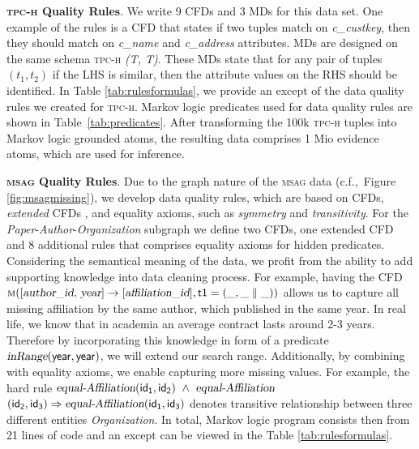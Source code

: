 \textbf{\textsc{tpc-h} Quality Rules}. We write 9 CFDs and 3 MDs for this data set. One example of the rules is a CFD that states if two tuples match on \textsl{c\_custkey}, then they should match on \textsl{c\_name} and \textsl{c\_address} attributes. MDs are designed on the same schema \textsc{tpc-h} \textsl{(T, T)}. These MDs state that for any pair of tuples $(t_1,t_2)$ if the LHS is similar, then the attribute values on the RHS should be identified. In Table \ref{tab:rulesformulas}, we provide an except of the data quality rules we created for \textsc{tpc-h}. Markov logic predicates used for data quality rules are shown in Table~\ref{tab:predicates}. After transforming the 100k \textsc{tpc-h} tuples into Markov logic grounded atoms, the resulting data comprises 1 Mio evidence atoms, which are used for inference. 

\textbf{\textsc{msag} Quality Rules}. Due to the graph nature of the \textsc{msag} data (c.f.,~Figure \ref{fig:msagmissing}), we develop data quality rules, which are based on CFDs, \textit{extended} CFDs \cite{Chen2009extended}, and equality axioms, such as \textit{symmetry} and \textit{transitivity}. For the \textit{Paper}-\textit{Author}-\textit{Organization} subgraph we define two CFDs, one extended CFD and 8 additional rules that comprises equality axioms for hidden predicates. Considering the semantical meaning of the data, we profit from the ability to add supporting knowledge into data cleaning process. For example, having the CFD $\mathsf{\textsc{m}([\textsl{author\_id, year}] \rightarrow [\textsl{affiliation\_id}],t1=(\_,\_ \parallel \_))} $  allows us to capture all missing affiliation by the same author, which published in the same year. In real life, we know that in academia an average contract lasts around 2-3 years. Therefore by incorporating this knowledge in form of a predicate $\mathsf{\textsl{inRange}(year, year)}$, we will extend our search range. Additionally, by combining with equality axioms, we enable capturing more missing values. For example, the hard rule $\mathsf{\textsl{equal-Affiliation}(id_1, id_2) ~\wedge~ \textsl{equal-Affiliation}}$ $\mathsf{(id_2, id_3) \Rightarrow  \textsl{equal-Affiliation}(id_1, id_3)}$ denotes transitive relationship between three different entities \textit{Organization}. In total, Markov logic program consists then from 21 lines of code and an except can be viewed in the Table \ref{tab:rulesformulas}. 

